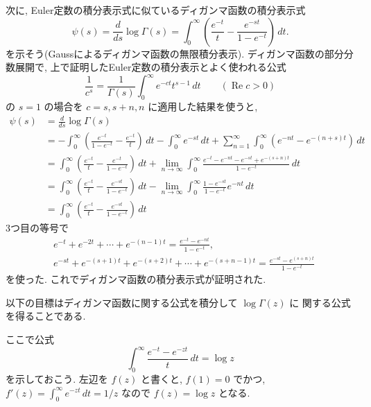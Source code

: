 \documentclass[12pt,twoside]{jarticle}
\renewcommand\Re{\operatorname{Re}}
\theoremstyle{jplain}
\theoremstyle{jplain}
\theoremstyle{jplain}
\numberwithin{theorem}{section}
\numberwithin{equation}{section}
\numberwithin{figure}{section}
\numberwithin{table}{section}
\begin{document}
次に, Euler定数の積分表示式に似ているディガンマ函数の積分表示式
\[
\psi(s)=\frac{d}{ds}\log\Gamma(s)
=\int_0^\infty\left(\frac{e^{-t}}{t}-\frac{e^{-st}}{1-e^{-t}}\right)\,dt.
\]
を示そう(Gaussによるディガンマ函数の無限積分表示).
ディガンマ函数の部分分数展開で,
上で証明したEuler定数の積分表示とよく使われる公式
\[
\frac{1}{c^s} = \frac{1}{\Gamma(s)}\int_0^\infty e^{-ct}t^{s-1}\,dt
\qquad (\Re c>0)
\tag{$\$$}
\]
の $s=1$ の場合を $c=s,s+n,n$ に適用した結果を使うと,
\begin{align*}
\psi(s)
&
=\frac{d}{ds}\log\Gamma(s)
\\ &
=
-\int_0^\infty\left(\frac{e^{-t}}{1-e^{-t}}-\frac{e^{-t}}{t}\right)\,dt
-\int_0^\infty e^{-st}\,dt
+\sum_{n=1}^\infty \int_0^\infty (e^{-nt}-e^{-(n+s)t})\,dt
\\ &
=
\int_0^\infty\left(\frac{e^{-t}}{t}-\frac{e^{-t}}{1-e^{-t}}\right)\,dt
+\lim_{n\to\infty}
\int_0^\infty \frac{e^{-t}-e^{-nt}-e^{-st}+e^{-(s+n)t}}{1-e^{-t}}\,dt
\\ &
=
\int_0^\infty\left(\frac{e^{-t}}{t}-\frac{e^{-st}}{1-e^{-t}}\right)\,dt
-\lim_{n\to\infty}
\int_0^\infty \frac{1-e^{-st}}{1-e^{-t}} e^{-nt} \,dt
\\ &
=
\int_0^\infty\left(\frac{e^{-t}}{t}-\frac{e^{-st}}{1-e^{-t}}\right)\,dt
\end{align*}
3つ目の等号で
\begin{align*}
&
e^{-t}+e^{-2t}+\cdots+e^{-(n-1)t}=\frac{e^{-t}-e^{-nt}}{1-e^{-t}},
\\ &
e^{-st}+e^{-(s+1)t}+e^{-(s+2)t}+\cdots+e^{-(s+n-1)t}=\frac{e^{-st}-e^{(s+n)t}}{1-e^{-t}}
\end{align*}
を使った. これでディガンマ函数の積分表示式が証明された.

以下の目標はディガンマ函数に関する公式を積分して $\log\Gamma(z)$ に
関する公式を得ることである.

ここで公式
\[
  \int_0^\infty \frac{e^{-t}-e^{-zt}}{t}\,dt = \log z
\tag{$*$}
\]
を示しておこう. 左辺を $f(z)$ と書くと, $f(1)=0$ でかつ,
$f'(z)=\int_0^\infty e^{-zt}\,dt=1/z$ なので $f(z)=\log z$ となる.
\end{document}
